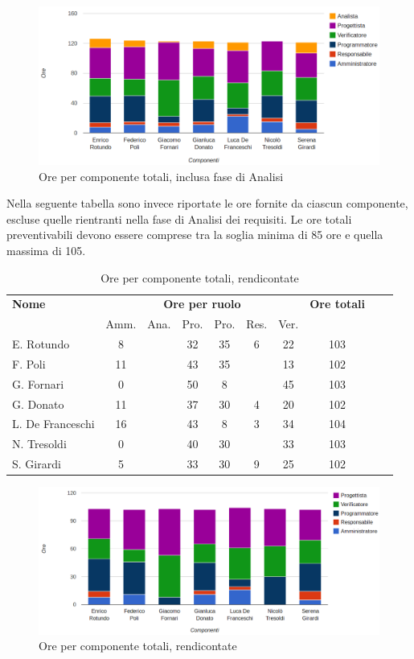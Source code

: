 \begin{figure}[H]
\centering
\includegraphics[scale=0.35]{4-5-1.png}
\caption{Ore per componente totali, inclusa fase di Analisi\label{fig:nome}}
\end{figure}

Nella seguente tabella sono invece riportate le ore fornite da ciascun componente, escluse quelle rientranti nella fase di Analisi dei requisiti. 
Le ore totali preventivabili devono essere comprese tra la soglia minima di 85 ore e quella massima di 105.

\begin{table}[H]
\centering
\begin{tabular}{lccccccccc}
\toprule 
    \textbf{Nome}  & \multicolumn{6}{c}{\textbf{Ore per ruolo}} & \textbf{Ore totali}\\
    & Amm. & Ana. & Pro. & Pro. & Res. & Ver. \\
    \midrule
    E. Rotundo   	& 8 & & 32 & 35 & 6 & 22 & 103 \\
    F. Poli  		& 11	& & 43 & 35 &   & 13 & 102 \\
    G. Fornari		& 0	& & 50 & 8  &   & 45 & 103 \\
    G. Donato 		& 11	& & 37 & 30 & 4 & 20 & 102 \\
    L. De Franceschi 	& 16	& & 43 & 8  & 3 & 34 & 104 \\
    N. Tresoldi 		& 0	& & 40 & 30 &   & 33 & 103 \\
    S. Girardi 		& 5	& & 33 & 30 & 9 & 25 & 102 \\
    
    \bottomrule
\end{tabular}
\caption{Ore per componente totali, rendicontate}
\end{table}

\begin{figure}[H]
\centering
\includegraphics[scale=0.35]{4-5-2.png}
\caption{Ore per componente totali, rendicontate\label{fig:nome}}
\end{figure}